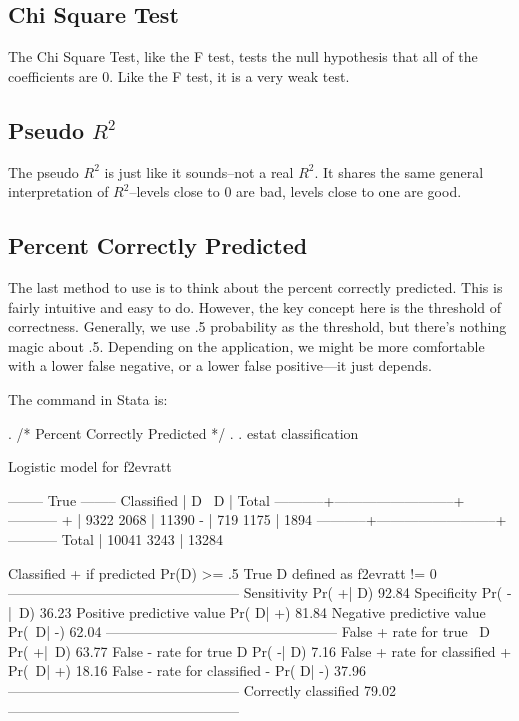 \documentclass[12pt]{article}
\begin{document}
\subsection{Chi Square Test}

The Chi Square Test, like the F test, tests the null hypothesis that
all of the coefficients are 0. Like the F test, it is  a very weak
test. 

\subsection{Pseudo $R^2$}

The pseudo $R^2$ is just like it sounds--not a real $R^2$. It shares
the same general interpretation of $R^2$--levels close to 0 are bad,
levels close to one are good. 

\subsection{Percent Correctly Predicted}

The last method to use is to think about the percent correctly
predicted. This is fairly intuitive and easy to do. However, the key
concept here is the threshold of correctness. Generally, we use .5
probability as the threshold, but there's nothing magic about
.5. Depending on the application, we might be more comfortable with a
lower false negative, or a lower false positive---it just depends. 

The command in Stata is:


\begin{stlog}

. /* Percent Correctly Predicted  */
. 
. estat classification

Logistic model for f2evratt

              -------- True --------
Classified |         D            ~D  |      Total
-----------+--------------------------+-----------
     +     |      9322          2068  |      11390
     -     |       719          1175  |       1894
-----------+--------------------------+-----------
   Total   |     10041          3243  |      13284

Classified + if predicted Pr(D) >= .5
True D defined as f2evratt != 0
--------------------------------------------------
Sensitivity                     Pr( +| D)   92.84%
Specificity                     Pr( -|~D)   36.23%
Positive predictive value       Pr( D| +)   81.84%
Negative predictive value       Pr(~D| -)   62.04%
--------------------------------------------------
False + rate for true ~D        Pr( +|~D)   63.77%
False - rate for true D         Pr( -| D)    7.16%
False + rate for classified +   Pr(~D| +)   18.16%
False - rate for classified -   Pr( D| -)   37.96%
--------------------------------------------------
Correctly classified                        79.02%
--------------------------------------------------


\end{stlog}
\end{document}
